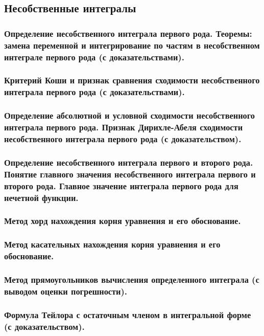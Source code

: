 \documentclass[10pt]{article}
\begin{document}
    
    \subsection{Несобственные интегралы}
    \subsubsection{Определение несобственного интеграла первого рода. Теоремы: замена переменной и интегрирование по частям в несобственном интеграле первого рода (с доказательствами).}
    



    \subsubsection{Критерий Коши и признак сравнения сходимости несобственного интеграла первого рода (с доказательствами).}
    \subsubsection{Определение абсолютной и условной сходимости несобственного интеграла первого рода. Признак Дирихле-Абеля сходимости несобственного интеграла первого рода (с доказательством).}
    \subsubsection{Определение несобственного интеграла первого и второго рода. Понятие главного значения несобственного интеграла первого и второго рода. Главное значение интеграла первого рода для нечетной функции.}
    \subsubsection{Метод хорд нахождения корня уравнения и его обоснование.}
    \subsubsection{Метод касательных нахождения корня уравнения и его обоснование.}
    \subsubsection{Метод прямоугольников вычисления определенного интеграла (с выводом оценки погрешности).}
    \subsubsection{Формула Тейлора с остаточным членом в интегральной форме (с доказательством).}
\end{document}
